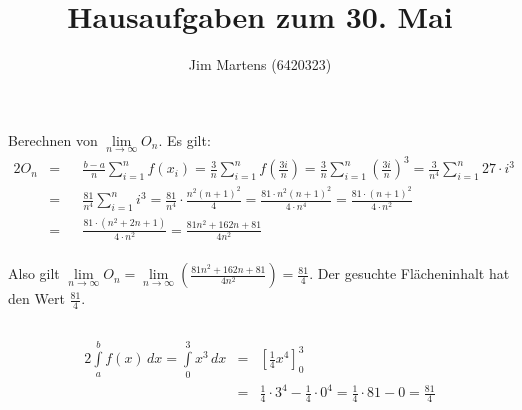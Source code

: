 \documentclass[10pt,a4paper,oneside,ngerman,numbers=noenddot]{scrartcl}
\begin{document}
\author{Jim Martens (6420323)}
\title{Hausaufgaben zum 30. Mai}
\maketitle
\section{} %
\subsection{} %
Berechnen von $\lim\limits_{n \rightarrow \infty} O_{n}$. Es gilt:\\
\begin{alignat*}{2}
O_{n} &=&& \frac{b-a}{n} \sum\limits_{i=1}^{n} f(x_{i}) = \frac{3}{n} \sum\limits_{i=1}^{n} f\left( \frac{3i}{n}\right) = \frac{3}{n} \sum\limits_{i=1}^{n} \left( \frac{3i}{n}\right)^{3} = \frac{3}{n^{4}} \sum\limits_{i=1}^{n} 27 \cdot i^{3}\\
&=&& \frac{81}{n^{4}} \sum\limits_{i=1}^{n} i^{3} = \frac{81}{n^{4}} \cdot \frac{n^{2}(n+1)^{2}}{4} = \frac{81 \cdot n^{2}(n+1)^{2}}{4 \cdot n^{4}} = \frac{81 \cdot (n+1)^{2}}{4 \cdot n^{2}} \\
&=&& \frac{81 \cdot (n^{2} + 2n + 1)}{4 \cdot n^{2}} = \frac{81n^{2} + 162n + 81}{4n^{2}}
\end{alignat*}\\
Also gilt $\lim\limits_{n \rightarrow \infty} O_{n} = \lim\limits_{n \rightarrow \infty} \left(\frac{81n^{2} + 162n + 81}{4n^{2}} \right) = \frac{81}{4}$. Der gesuchte Flächeninhalt hat den Wert $\frac{81}{4}$.
\subsection{} %
\begin{alignat*}{2}
\int\limits_{a}^{b} f(x) \,dx = \int\limits_{0}^{3} x^{3} \,dx &=& \left[\frac{1}{4}x^{4}\right]_{0}^{3} \\
&=& \frac{1}{4} \cdot 3^{4} - \frac{1}{4} \cdot 0^{4} = \frac{1}{4} \cdot 81 - 0 = \frac{81}{4}
\end{alignat*}
\section{} %
\end{document}
